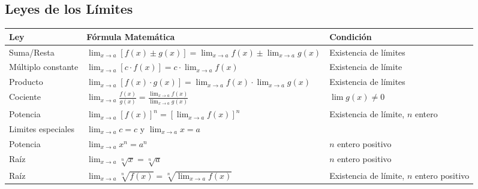 \documentclass[a4paper,12pt]{article}
\theoremstyle{definition}
\begin{document}
\subsection{Leyes de los Límites}
\begin{table}[h!]
    \centering
    \renewcommand{\arraystretch}{1.5}
    \begin{tabular}{l l l}
        \toprule
        \textbf{Ley} & \textbf{Fórmula Matemática} & \textbf{Condición} \\
        \midrule
        Suma/Resta & $\lim_{x \to a} [f(x) \pm g(x)] = \lim_{x \to a} f(x) \pm \lim_{x \to a} g(x)$ & Existencia de límites \\
        Múltiplo constante & $\lim_{x \to a} [c \cdot f(x)] = c \cdot \lim_{x \to a} f(x)$ & Existencia de límite \\
        Producto & $\lim_{x \to a} [f(x) \cdot g(x)] = \lim_{x \to a} f(x) \cdot \lim_{x \to a} g(x)$ & Existencia de límites \\
        Cociente & $\lim_{x \to a} \frac{f(x)}{g(x)} = \frac{\lim_{x \to a} f(x)}{\lim_{x \to a} g(x)}$ & $\lim g(x) \neq 0$ \\
        Potencia & $\lim_{x \to a} [f(x)]^n = [\lim_{x \to a} f(x)]^n$ & Existencia de límite, $n$ entero \\
        Limites especiales & $\lim_{x \to a} c = c$ y $\lim_{x \to a} x = a$ \\
        Potencia & $\lim_{x \to a} x^n = a^n$ & $n$ entero positivo\\
        Raíz & $\lim_{x \to a} \sqrt[n]{x} = \sqrt[n]{a}$ & $n$ entero positivo \\
        Raíz & $\lim_{x \to a} \sqrt[n]{f(x)} = \sqrt[n]{\lim_{x \to a} f(x)}$ & Existencia de límite, $n$ entero positivo \\
        \bottomrule
    \end{tabular}
\end{table}
\end{document}
